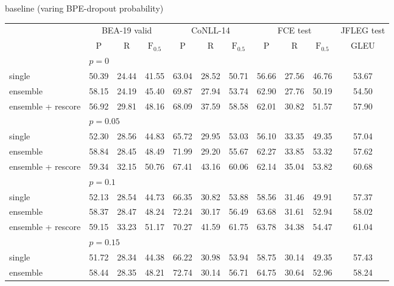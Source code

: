 \documentclass[11pt]{article}
\begin{document}
\begin{multicols}{2}
	\begin{table}[H]
		\centering
		\tiny
		\tabcolsep 1.2pt
		baseline (varing BPE-dropout probability) \\
		\begin{tabular}{@{\extracolsep{2.5pt}}l ccc|ccc|ccc|c@{}}
			\hline
			& \multicolumn{3}{c}{BEA-19 valid}
			& \multicolumn{3}{c}{CoNLL-14}
			& \multicolumn{3}{c}{FCE test}
			& \multicolumn{1}{c}{\hspace{-2em}JFLEG test\hspace{-2em}}
			\\ \cline{2-4} \cline{5-7} \cline{8-10} \cline{11-11}
			& P & R & $\textrm{F}_{0.5}$
			& P & R & $\textrm{F}_{0.5}$
			& P & R & $\textrm{F}_{0.5}$
			& GLEU \\
			\hline
			& \multicolumn{10}{l}{$p = 0$} \\
			single
			& 50.39 & 24.44 & 41.55 & 63.04 & 28.52 & 50.71 & 56.66 & 27.56 & 46.76 & 53.67 \\
			ensemble
			& 58.15 & 24.19 & 45.40 & 69.87 & 27.94 & 53.74 & 62.90 & 27.76 & 50.19 & 54.50 \\
			ensemble + rescore
			& 56.92 & 29.81 & 48.16 & 68.09 & 37.59 & 58.58 & 62.01 & 30.82 & 51.57 & 57.90 \\
			\hline
			& \multicolumn{10}{l}{$p = 0.05$} \\
			single
			& 52.30 & 28.56 & 44.83 & 65.72 & 29.95 & 53.03 & 56.10 & 33.35 & 49.35 & 57.04 \\
			ensemble
			& 58.84 & 28.45 & 48.49 & 71.99 & 29.20 & 55.67 & 62.27 & 33.85 & 53.32 & 57.62 \\
			ensemble + rescore
			& 59.34 & 32.15 & 50.76 & 67.41 & 43.16 & 60.06 & 62.14 & 35.04 & 53.82 & 60.68 \\
			\hline
			& \multicolumn{10}{l}{$p = 0.1$} \\
			single
			& 52.13 & 28.54 & 44.73 & 66.35 & 30.82 & 53.88 & 58.56 & 31.46 & 49.91 & 57.37 \\
			ensemble
			& 58.37 & 28.47 & 48.24 & 72.24 & 30.17 & 56.49 & 63.68 & 31.61 & 52.94 & 58.02 \\
			ensemble + rescore
			& 59.15 & 33.23 & 51.17 & 70.27 & 41.59 & 61.75 & 63.78 & 34.38 & 54.47 & 61.04 \\
			\hline
			& \multicolumn{10}{l}{$p = 0.15$} \\
			single
			& 51.72 & 28.34 & 44.38 & 66.22 & 30.98 & 53.94 & 58.75 & 30.14 & 49.35 & 57.43 \\
			ensemble
			& 58.44 & 28.35 & 48.21 & 72.74 & 30.14 & 56.71 & 64.75 & 30.64 & 52.96 & 58.24 \\

\end{tabular}
\end{table}
\end{multicols}
\end{document}

